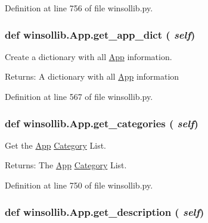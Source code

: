 Definition at line 756 of file winsollib.py.\hypertarget{classwinsollib_1_1App_1f799cba6ad125678e28f1b072638a3f}{
\subsubsection[get\_\-app\_\-dict]{\setlength{\rightskip}{0pt plus 5cm}def winsollib.App.get\_\-app\_\-dict ( {\em self})}}
\label{classwinsollib_1_1App_1f799cba6ad125678e28f1b072638a3f}


Create a dictionary with all \hyperlink{classwinsollib_1_1App}{App} information. 

\begin{Desc}
\item[Returns:]A dictionary with all \hyperlink{classwinsollib_1_1App}{App} information \end{Desc}


Definition at line 567 of file winsollib.py.\hypertarget{classwinsollib_1_1App_ccb84833e593ebd7d619115e86ceb6d6}{
\subsubsection[get\_\-categories]{\setlength{\rightskip}{0pt plus 5cm}def winsollib.App.get\_\-categories ( {\em self})}}
\label{classwinsollib_1_1App_ccb84833e593ebd7d619115e86ceb6d6}


Get the \hyperlink{classwinsollib_1_1App}{App} \hyperlink{classwinsollib_1_1Category}{Category} List. 

\begin{Desc}
\item[Returns:]The \hyperlink{classwinsollib_1_1App}{App} \hyperlink{classwinsollib_1_1Category}{Category} List. \end{Desc}


Definition at line 750 of file winsollib.py.\hypertarget{classwinsollib_1_1App_a124553446cdb7443fcfcd418b5be5cc}{
\subsubsection[get\_\-description]{\setlength{\rightskip}{0pt plus 5cm}def winsollib.App.get\_\-description ( {\em self})}}
\label{classwinsollib_1_1App_a124553446cdb7443fcfcd418b5be5cc}


